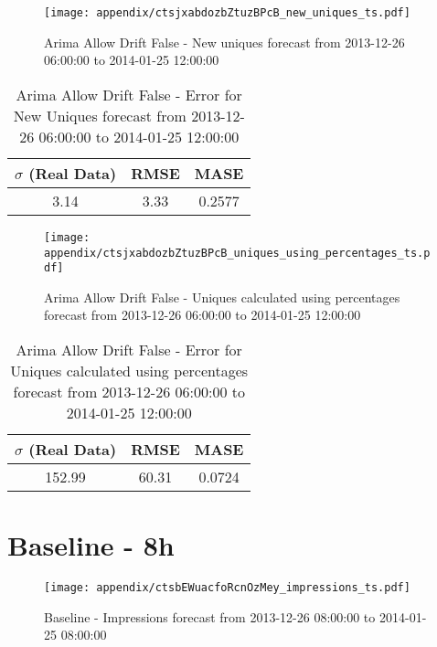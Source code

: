 \begin{figure}[H] \begin{center} \leavevmode
\texttt{[image: appendix/ctsjxabdozbZtuzBPcB\_new\_uniques\_ts.pdf]} \caption{
Arima Allow Drift False - New uniques forecast from 2013-12-26 06:00:00 to 2014-01-25 12:00:00} \label{fig:appendix/ctsjxabdozbZtuzBPcB_new_uniques_ts.pdf} \end{center}
\end{figure}

\begin{table}[H]
\centering
\footnotesize
\begin{tabular}{ccc}
$\sigma$ (Real Data) & RMSE & MASE   \\ \hline
3.14 & 3.33 & 0.2577 \\
\end{tabular}

\vspace{0.5cm}

\caption{
Arima Allow Drift False - Error for New Uniques forecast from 2013-12-26 06:00:00 to 2014-01-25 12:00:00}
\end{table}

\begin{figure}[H] \begin{center} \leavevmode
\texttt{[image: appendix/ctsjxabdozbZtuzBPcB\_uniques\_using\_percentages\_ts.pdf]} \caption{
Arima Allow Drift False - Uniques calculated using percentages forecast from 2013-12-26 06:00:00 to 2014-01-25 12:00:00} \label{fig:appendix/ctsjxabdozbZtuzBPcB_uniques_using_percentages_ts.pdf} \end{center}
\end{figure}

\begin{table}[H]
\centering
\footnotesize
\begin{tabular}{ccc}
$\sigma$ (Real Data) & RMSE & MASE   \\ \hline
152.99 & 60.31 & 0.0724 \\
\end{tabular}

\vspace{0.5cm}

\caption{
Arima Allow Drift False - Error for Uniques calculated using percentages forecast from 2013-12-26 06:00:00 to 2014-01-25 12:00:00}
\end{table}

\section{Baseline - 8h}
\begin{figure}[H] \begin{center} \leavevmode
\texttt{[image: appendix/ctsbEWuacfoRcnOzMey\_impressions\_ts.pdf]} \caption{
Baseline - Impressions forecast from 2013-12-26 08:00:00 to 2014-01-25 08:00:00} \label{fig:appendix/ctsbEWuacfoRcnOzMey_impressions_ts.pdf} \end{center}
\end{figure}

